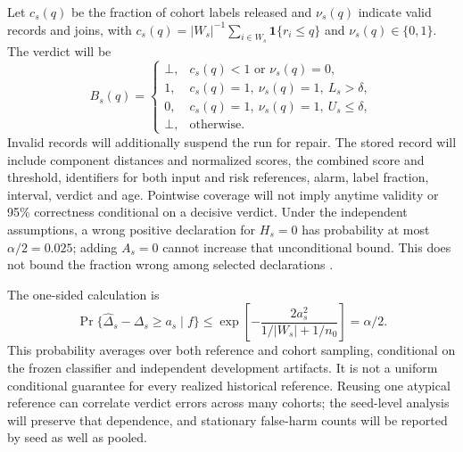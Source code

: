 \documentclass[11pt,a4paper]{article}
\newcommand{\ind}{\mathbf{1}}
\begin{document}
Let $c_s(q)$ be the fraction of cohort labels released and $\nu_s(q)$ indicate
valid records and joins, with
$c_s(q)=|W_s|^{-1}\sum_{i\in W_s}\ind\{r_i\leq q\}$ and
$\nu_s(q)\in\{0,1\}$. The verdict will be
\begin{equation}
B_s(q)=\begin{cases}
\bot,&c_s(q)<1\text{ or }\nu_s(q)=0,\\
1,&c_s(q)=1,\ \nu_s(q)=1,\ L_s>\delta,\\
0,&c_s(q)=1,\ \nu_s(q)=1,\ U_s\leq\delta,\\
\bot,&\text{otherwise}.
\end{cases}
\end{equation}
Invalid records will additionally suspend the run for repair. The stored record
will include component distances and normalized scores, the combined score
and threshold, identifiers for both input and risk references, alarm,
label fraction, interval, verdict and
age. Pointwise coverage will not imply anytime validity or 95\% correctness
conditional on a decisive verdict. Under the independent assumptions, a wrong
positive declaration for $H_s=0$ has probability at most $\alpha/2=0.025$;
adding $A_s=0$ cannot increase that unconditional bound. This does not bound
the fraction wrong among selected declarations \cite{hoeffding,selective,awsjoin}.

The one-sided calculation is
\begin{equation}
\Pr\{\widehat\Delta_s-\Delta_s\geq a_s\mid f\}
\leq \exp\!\left[-\frac{2a_s^2}{1/|W_s|+1/n_0}\right]
=\alpha/2.
\end{equation}
This probability averages over both reference and cohort sampling, conditional
on the frozen classifier and independent development artifacts. It is not a
uniform conditional guarantee for every realized historical reference. Reusing
one atypical reference can correlate verdict errors across many cohorts;
the seed-level analysis will preserve that dependence, and stationary
false-harm counts will be reported by seed as well as pooled.
\end{document}
